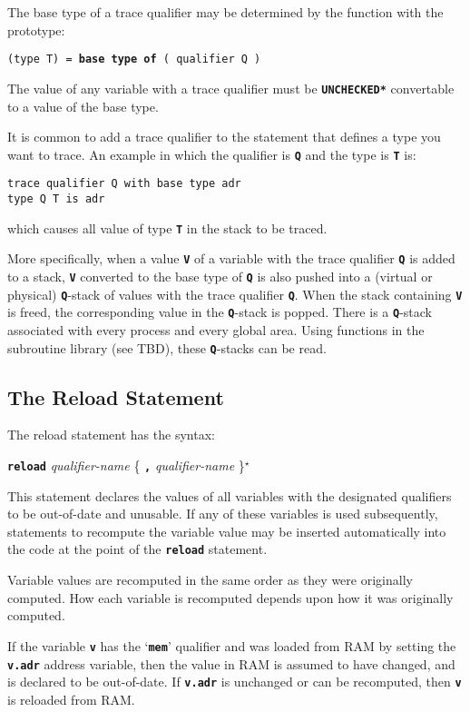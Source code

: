 \documentclass[12pt]{article}
\makeatletter
\newcommand{\TT}[1]{{\tt \bfseries #1}}
\newcommand{\ttkey}[1]{\TT{#1}\index{#1@{\tt #1}}}
\newcommand{\STAR}{{\Large $^\star$}}
\newenvironment{indpar}[1][0.3in]%
	{\begin{list}{}%
		     {\setlength{\itemsep}{0in}%
		      \setlength{\topsep}{0in}%
		      \setlength{\parsep}{1ex}%
		      \setlength{\labelwidth}{#1}%
		      \setlength{\leftmargin}{#1}%
		      \addtolength{\leftmargin}{\labelsep}}%
	 \item}%
	{\end{list}}
\makeatother
\begin{document}
The base type of a trace qualifier may be determined by the
function with the prototype:
\begin{center}
{\tt (type T) = \ttkey{base type of} ( qualifier Q )}
\end{center}
The value of any variable with a trace qualifier must be
\TT{*UNCHECKED*} convertable to a value of the base type.

It is common to add a trace qualifier to the statement that
defines a type you want to trace.  An example in which the
qualifier is \TT{Q} and the type is \TT{T} is:
\begin{indpar}\begin{verbatim}
trace qualifier Q with base type adr
type Q T is adr
\end{verbatim}\end{indpar}
which causes all value of type \TT{T} in the stack to be
traced.

More specifically, when a value \TT{V} of a variable with the trace
qualifier \TT{Q} is added to a stack, \TT{V} converted to the
base type of \TT{Q} is also
pushed into a (virtual or physical) \TT{Q}-stack of values with
the trace qualifier \TT{Q}.
When the stack containing \TT{V} is freed, the corresponding
value in the \TT{Q}-stack is popped.  There is a \TT{Q}-stack
associated with every process and every global area.
Using functions in the
subroutine library (see TBD), these \TT{Q}-stacks can be read.

\subsection{The Reload Statement}
\label{THE-RELOAD-COMMAND}

The reload statement has the syntax:
\begin{center}
\ttkey{reload} {\em qualifier-name} \{ \TT{,} {\em qualifier-name} \}\STAR{}
\end{center}

This statement declares the values of all variables with the designated
qualifiers to be out-of-date and unusable.  If any of these variables
is used subsequently, statements to recompute the variable value
may be inserted automatically into the code at the point of the
\TT{reload} statement.

Variable values are recomputed in the same order as they were
originally computed.  How each variable is recomputed depends upon
how it was originally computed.

If the variable \TT{v} has the `\TT{mem}' qualifier and was loaded
from RAM by setting the \TT{v.adr} address variable, then the value
in RAM is assumed to have changed, and is declared to be out-of-date.
If \TT{v.adr} is unchanged or
can be recomputed, then \TT{v} is reloaded from RAM.
\end{document}
